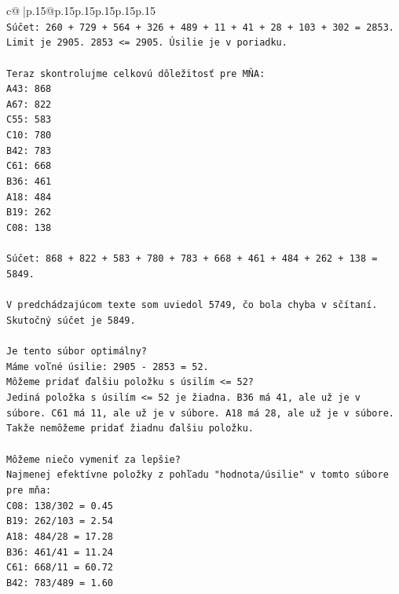 \documentclass{article}
\begin{document}
{\begin{supertabular}{c@{$\;$}|p{.15\linewidth}@{}p{.15\linewidth}p{.15\linewidth}p{.15\linewidth}p{.15\linewidth}p{.15\linewidth}}
{{{\\ 
\texttt{Súčet: 260 + 729 + 564 + 326 + 489 + 11 + 41 + 28 + 103 + 302 = 2853.} \\
\texttt{Limit je 2905. 2853 <= 2905. Úsilie je v poriadku.} \\
\\ 
\texttt{Teraz skontrolujme celkovú dôležitosť pre MŇA:} \\
\texttt{A43: 868} \\
\texttt{A67: 822} \\
\texttt{C55: 583} \\
\texttt{C10: 780} \\
\texttt{B42: 783} \\
\texttt{C61: 668} \\
\texttt{B36: 461} \\
\texttt{A18: 484} \\
\texttt{B19: 262} \\
\texttt{C08: 138} \\
\\ 
\texttt{Súčet: 868 + 822 + 583 + 780 + 783 + 668 + 461 + 484 + 262 + 138 = 5849.} \\
\\ 
\texttt{V predchádzajúcom texte som uviedol 5749, čo bola chyba v sčítaní. Skutočný súčet je 5849.} \\
\\ 
\texttt{Je tento súbor optimálny?} \\
\texttt{Máme voľné úsilie: 2905 {-} 2853 = 52.} \\
\texttt{Môžeme pridať ďalšiu položku s úsilím <= 52?} \\
\texttt{Jediná položka s úsilím <= 52 je žiadna. B36 má 41, ale už je v súbore. C61 má 11, ale už je v súbore. A18 má 28, ale už je v súbore.} \\
\texttt{Takže nemôžeme pridať žiadnu ďalšiu položku.} \\
\\ 
\texttt{Môžeme niečo vymeniť za lepšie?} \\
\texttt{Najmenej efektívne položky z pohľadu "hodnota/úsilie" v tomto súbore pre mňa:} \\
\texttt{C08: 138/302 = 0.45} \\
\texttt{B19: 262/103 = 2.54} \\
\texttt{A18: 484/28 = 17.28} \\
\texttt{B36: 461/41 = 11.24} \\
\texttt{C61: 668/11 = 60.72} \\
\texttt{B42: 783/489 = 1.60} \\
}}}
\end{supertabular}}
\end{document}

